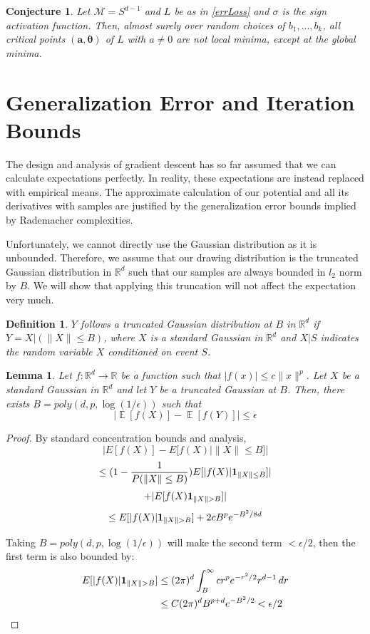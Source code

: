 \documentclass{article}
\newtheorem{lemma}[theorem]{Lemma}
\newtheorem{conjecture}[theorem]{Conjecture}
\newtheorem{definition}[theorem]{Definition}
\newcommand{\R}{{\mathbb{R}}}
\DeclareMathOperator*{\expt}{\mathbb{E}}
\begin{document}
\begin{conjecture}
 Let $\mathcal{M} = S^{d-1}$ and $L$ be as in \eqref{errLoss} and $\sigma$ is the sign activation function. Then, almost surely over random choices of $b_1,...,b_k$, all critical points $(\boldsymbol{a,\theta})$ of $L$ with $a \neq 0$ are not local minima, except at the global minima. 
\end{conjecture}



\section{Generalization Error and Iteration Bounds}
\label{finite}
 
The design and analysis of gradient descent has so far assumed that we can calculate expectations perfectly. In reality, these expectations are instead replaced with empirical means. The approximate calculation of our potential and all its derivatives with samples are justified by the generalization error bounds implied by Rademacher complexities. 

Unfortunately, we cannot directly use the Gaussian distribution as it is unbounded. Therefore, we assume that our drawing distribution is the truncated Gaussian distribution in $\R^d$ such that our samples are always bounded in $l_2$ norm by $B$. We will show that applying this truncation will not affect the expectation very much. 

\begin{definition}
$Y$ follows a truncated Gaussian distribution at $B$ in $\R^d$ if $Y = X | ( \|X\| \leq B)$, where $X$ is a standard Gaussian in $\R^d$ and $ X \Big|S$ indicates the random variable $X$ conditioned on event $S$.
\end{definition}
%
\begin{lemma}
\label{choppedLem}
Let $f : \R^d \to \R$ be a function such that $|f(x)| \leq c\|x\|^p$. Let $X$ be a standard Gaussian in $\R^d$ and let $Y$ be a truncated Gaussian at $B$. Then, there exists $B = poly(d,p,\log(1/\epsilon))$ such that 
\[ \left|\expt[f(X)] - \expt[f(Y)] \right| \leq \epsilon\]
\end{lemma}

\begin{proof}
By standard concentration bounds and analysis, 
\[|E[f(X)] - E[f(X)| \|X\|\leq B]| \]
\[\leq (1- \frac{1}{P(\|X\|\leq B)}) E[|f(X)|{\bf 1}_{\|X\|\leq B}]| \]
\[+ |E[f(X){\bf 1}_{\|X\|>B}]|\]
\[\leq E[|f(X)|{\bf 1}_{\|X\|>B}] + 2cB^pe^{-B^2/8d}\]


Taking $B = poly(d,p,\log(1/\epsilon))$ will make the second term $< \epsilon/2$, then the first term is also bounded by:
\begin{align*}
  E[|f(X)|{\bf 1}_{\|X\|>B}] &\leq (2\pi)^d \int_B^\infty cr^pe^{-r^2/2}r^{d-1}\,dr \\
                             &\leq C(2\pi)^dB^{p+d}e^{-B^2/2} < \epsilon/2
\end{align*}
\end{proof}
\end{document}
